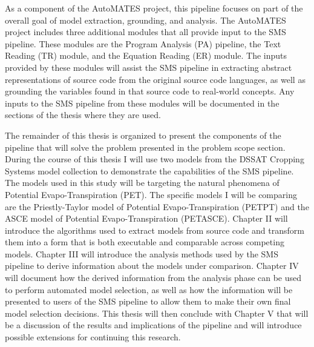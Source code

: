 As a component of the AutoMATES project, this pipeline focuses on part of the overall goal of model extraction, grounding, and analysis.
The AutoMATES project includes three additional modules that all provide input to the SMS pipeline.
These modules are the Program Analysis (PA) pipeline, the Text Reading (TR) module, and the Equation Reading (ER) module.
The inputs provided by these modules will assist the SMS pipeline in extracting abstract representations of source code from the original source code languages, as well as grounding the variables found in that source code to real-world concepts.
Any inputs to the SMS pipeline from these modules will be documented in the sections of the thesis where they are used.

The remainder of this thesis is organized to present the components of the pipeline that will solve the problem presented in the problem scope section.
During the course of this thesis I will use two models from the DSSAT Cropping Systems model collection to demonstrate the capabilities of the SMS pipeline.
The models used in this study will be targeting the natural phenomena of Potential Evapo-Transpiration (PET).
The specific models I will be comparing are the Priestly-Taylor model of Potential Evapo-Transpiration (PETPT) and the ASCE model of Potential Evapo-Transpiration (PETASCE).
Chapter II will introduce the algorithms used to extract models from source code and transform them into a form that is both executable and comparable across competing models.
Chapter III will introduce the analysis methods used by the SMS pipeline to derive information about the models under comparison.
Chapter IV will document how the derived information from the analysis phase can be used to perform automated model selection, as well as how the information will be presented to users of the SMS pipeline to allow them to make their own final model selection decisions.
This thesis will then conclude with Chapter V that will be a discussion of the results and implications of the pipeline and will introduce possible extensions for continuing this research.

